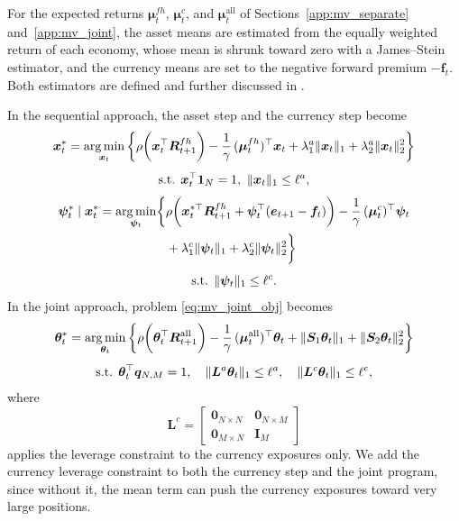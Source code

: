 For the expected returns $\bm{\mu}^{fh}_t$, $\bm{\mu}^c_t$, and $\bm{\mu}^{\text{all}}_t$ of
Sections~\ref{app:mv_separate} and~\ref{app:mv_joint}, the asset means are estimated from the equally weighted return
of each economy, whose mean is shrunk toward zero with a James--Stein estimator, and the currency means are set to the
negative forward premium $-\bm{f}_t$. Both estimators are defined and further discussed in
.

In the sequential approach, the asset step and the currency step become
\begin{equation}
\begin{gathered}
    \bm{x}_t^* = \operatorname*{arg\,min}_{\bm{x}_t} \left\{ \rho\biggl( \bm{x}_t^\top \bm{R}^{fh}_{t+1} \biggr)
    - \frac{1}{\gamma}\, (\bm{\mu}^{fh}_t)^\top \bm{x}_t
    + \lambda_1^a \|\bm{x}_t\|_1 + \lambda_2^a \|\bm{x}_t\|_2^2 \right\} \\[4pt]
    \text{s.t. } \bm{x}_t^\top \bm{1}_N = 1,\ \|\bm{x}_t\|_1 \le \ell^a,
\end{gathered}
\end{equation}
\begin{equation}
\begin{gathered}
    \begin{aligned}
    \bm{\psi}_t^* \mid \bm{x}_t^* = \operatorname*{arg\,min}_{\bm{\psi}_t} \biggl\{ &
    \rho\biggl( \bm{x}_t^{*\top} \bm{R}^{fh}_{t+1} + \bm{\psi}_t^\top (\bm{e}_{t+1} - \bm{f}_t) \biggr)
    - \frac{1}{\gamma}\, (\bm{\mu}^c_t)^\top \bm{\psi}_t \\
    & + \lambda_1^c \|\bm{\psi}_t\|_1 + \lambda_2^c \|\bm{\psi}_t\|_2^2 \biggr\}
    \end{aligned} \\[4pt]
    \text{s.t. } \|\bm{\psi}_t\|_1 \le \ell^c.
\end{gathered}
\end{equation}
In the joint approach, problem \eqref{eq:mv_joint_obj} becomes
\begin{equation}
\begin{gathered}
    \bm{\theta}_t^* = \operatorname*{arg\,min}_{\bm{\theta}_t} \left\{ \rho\biggl( \bm{\theta}_t^\top \bm{R}^{\text{all}}_{t+1} \biggr)
    - \frac{1}{\gamma}\, (\bm{\mu}^{\text{all}}_t)^\top \bm{\theta}_t
    + \|\bm{S}_1 \bm{\theta}_t\|_1 + \|\bm{S}_2 \bm{\theta}_t\|_2^2 \right\} \\[4pt]
    \text{s.t. } \bm{\theta}_t^\top \bm{q}_{N,M} = 1, \quad \|\bm{L}^a \bm{\theta}_t\|_1 \le \ell^a, \quad
    \|\bm{L}^c \bm{\theta}_t\|_1 \le \ell^c,
\end{gathered}
\end{equation}
where
\begin{equation*}
    \bm{L}^c = \begin{bmatrix} \bm{0}_{N \times N} & \bm{0}_{N \times M} \\ \bm{0}_{M \times N} & \bm{I}_M \end{bmatrix}
\end{equation*}
applies the leverage constraint to the currency exposures only. We add the currency leverage constraint to both the
currency step and the joint program, since without it, the mean term can push the currency exposures toward very large
positions.
